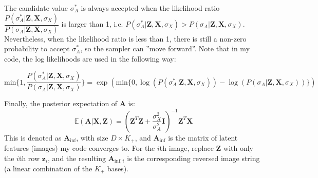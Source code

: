The candidate value $\sigma_{A}^{*}$ is always accepted when the likelihood ratio $\dfrac{P(\sigma_{A}^{*} | \mathbf{Z,X},\sigma_X)}{P(\sigma_{A} | \mathbf{Z,X},\sigma_X)}$ is larger than 1, i.e. $P(\sigma_{A}^{*} | \mathbf{Z,X},\sigma_X) > P(\sigma_{A} | \mathbf{Z,X},\sigma_X)$. Nevertheless, when the likelihood ratio is less than 1, there is still a non-zero probability to accept $\sigma_{A}^{*}$, so the sampler can ''move forward''. Note that in my code, the log likelihoods are used in the following way:

\begin{equation}
\text{min}\{ 1, \dfrac{P(\sigma_{A}^{*} | \mathbf{Z,X},\sigma_X)}{P(\sigma_{A} | \mathbf{Z,X},\sigma_X)} \} = \exp(\text{min}\{0, \log(P(\sigma_{A}^{*} | \mathbf{Z,X},\sigma_X)) - \log(P(\sigma_{A} | \mathbf{Z,X},\sigma_X))\})
\end{equation}

Finally, the posterior expectation of $\mathbf{A}$ is:
\begin{equation}
\mathbb{E}(\mathbf{A}|\mathbf{X,Z}) = (\mathbf{Z}^T\mathbf{Z}+\frac{\sigma_X^2}{\sigma_A^2}\mathbf{I})^{-1} \mathbf{Z}^T \mathbf{X}
\end{equation}
This is denoted as $\mathbf{A}_{\text{inf}}$, with size $D \times K_+$, and $\mathbf{A}_{\text{inf}}$ is the matrix of latent features (images) my code converges to. For the $i$th image, replace $\mathbf{Z}$ with only the $i$th row $\mathbf{z}_i$, and the resulting $\mathbf{A}_{\text{inf},i}$ is the corresponding reversed image string (a linear combination of the $K_+$ bases).